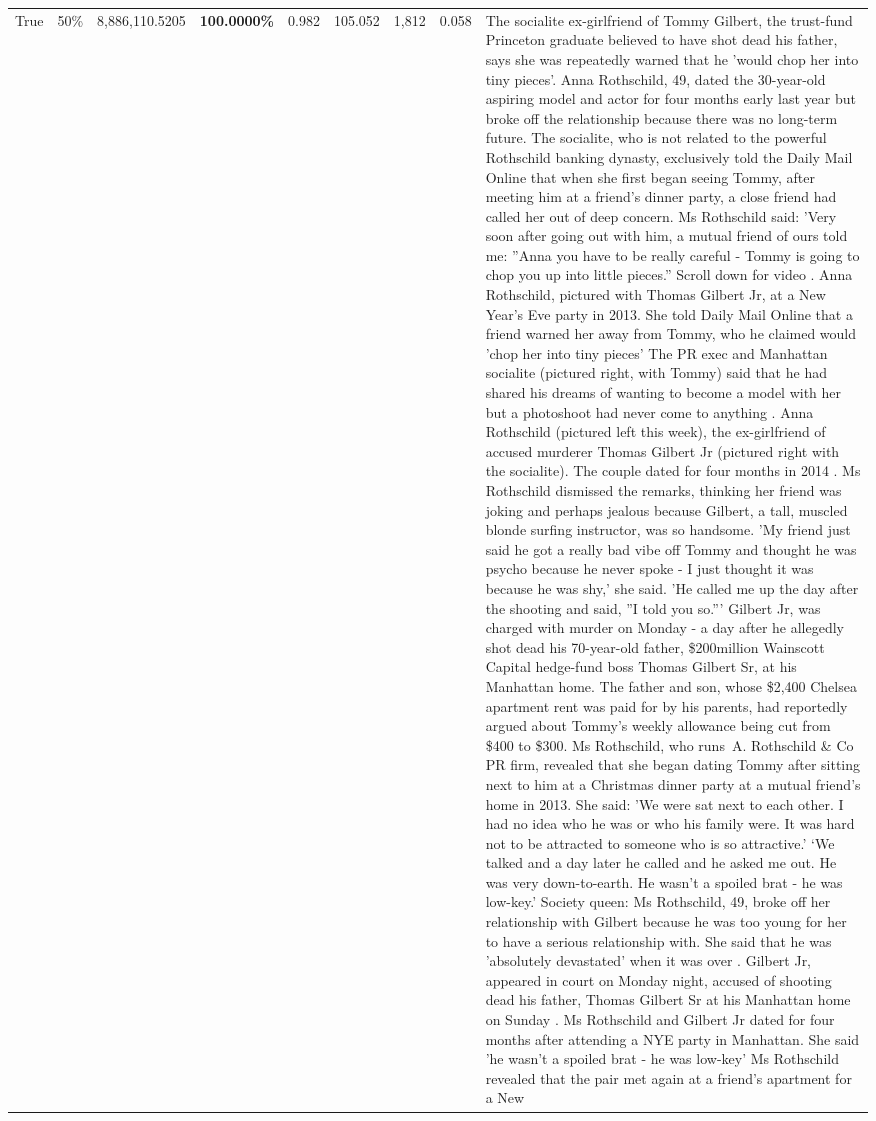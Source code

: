 \begin{table}[H]
\begin{tabular}{lllrlllll}
True & 50\% & 8,886,110.5205 & \bfseries \color{red} 100.0000\% & 0.982 & 105.052 & 1,812 & 0.058 & The socialite ex-girlfriend of Tommy Gilbert, the trust-fund Princeton graduate believed to have shot dead his father, says she was repeatedly warned that he 'would chop her into tiny pieces'. Anna Rothschild, 49, dated the 30-year-old aspiring model and actor for four months early last year but broke off the relationship because there was no long-term future. The socialite, who is not related to the powerful Rothschild banking dynasty, exclusively told the Daily Mail Online that when she first began seeing Tommy, after meeting him at a friend's dinner party, a close friend had called her out of deep concern. Ms Rothschild said: 'Very soon after going out with him, a mutual friend of ours told me: ''Anna you have to be really careful - Tommy is going to chop you up into little pieces.'' Scroll down for video . Anna Rothschild, pictured with Thomas Gilbert Jr, at a New Year's Eve party in 2013. She told Daily Mail Online that a friend warned her away from Tommy, who he claimed would 'chop her into tiny pieces' The PR exec and Manhattan socialite (pictured right, with Tommy) said that he had shared his dreams of wanting to become a model with her but a photoshoot had never come to anything . Anna Rothschild (pictured left this week), the ex-girlfriend of accused murderer Thomas Gilbert Jr (pictured right with the socialite). The couple dated for four months in 2014 . Ms Rothschild dismissed the remarks, thinking her friend was joking and perhaps jealous because Gilbert, a tall, muscled blonde surfing instructor, was so handsome. 'My friend just said he got a really bad vibe off Tommy and thought he was psycho because he never spoke - I just thought it was because he was shy,' she said. 'He called me up the day after the shooting and said, ''I told you so.''' Gilbert Jr, was charged with murder on Monday - a day after he allegedly shot dead his 70-year-old father, \$200million Wainscott Capital hedge-fund boss Thomas Gilbert Sr, at his Manhattan home. The father and son, whose \$2,400 Chelsea apartment rent was paid for by his parents, had reportedly argued about Tommy's weekly allowance being cut from \$400 to \$300. Ms Rothschild, who runs A. Rothschild \& Co PR firm, revealed that she began dating Tommy after sitting next to him at a Christmas dinner party at a mutual friend's home in 2013. She said: 'We were sat next to each other. I had no idea who he was or who his family were. It was hard not to be attracted to someone who is so attractive.' ‘We talked and a day later he called and he asked me out. He was very down-to-earth. He wasn’t a spoiled brat - he was low-key.’ Society queen: Ms Rothschild, 49, broke off her relationship with Gilbert because he was too young for her to have a serious relationship with. She said that he was 'absolutely devastated' when it was over . Gilbert Jr, appeared in court on Monday night, accused of shooting dead his father, Thomas Gilbert Sr at his Manhattan home on Sunday . Ms Rothschild and Gilbert Jr dated for four months after attending a NYE party in Manhattan. She said 'he wasn't a spoiled brat - he was low-key' Ms Rothschild revealed that the pair met again at a friend’s apartment for a New 
\end{tabular}
\end{table}
